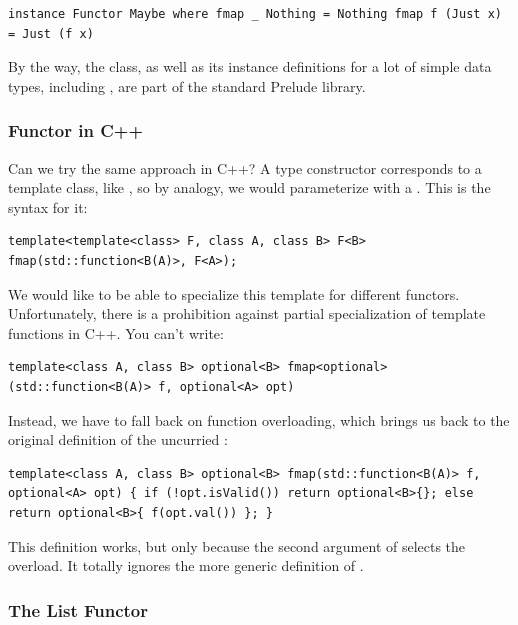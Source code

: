 \begin{verbatim}
instance Functor Maybe where fmap _ Nothing = Nothing fmap f (Just x) = Just (f x)
\end{verbatim}

By the way, the  class, as well as its instance
definitions for a lot of simple data types, including ,
are part of the standard Prelude library.

\subsubsection{Functor in C++}\label{functor-in-c}

Can we try the same approach in C++? A type constructor corresponds to a
template class, like , so by analogy, we would
parameterize  with a 
. This is the syntax for it:

\begin{verbatim}
template<template<class> F, class A, class B> F<B> fmap(std::function<B(A)>, F<A>);
\end{verbatim}

We would like to be able to specialize this template for different
functors. Unfortunately, there is a prohibition against partial
specialization of template functions in C++. You can't write:

\begin{verbatim}
template<class A, class B> optional<B> fmap<optional>(std::function<B(A)> f, optional<A> opt)
\end{verbatim}

Instead, we have to fall back on function overloading, which brings us
back to the original definition of the uncurried :

\begin{verbatim}
template<class A, class B> optional<B> fmap(std::function<B(A)> f, optional<A> opt) { if (!opt.isValid()) return optional<B>{}; else return optional<B>{ f(opt.val()) }; }
\end{verbatim}

This definition works, but only because the second argument of
 selects the overload. It totally ignores the more generic
definition of .

\subsubsection{The List Functor}\label{the-list-functor}


